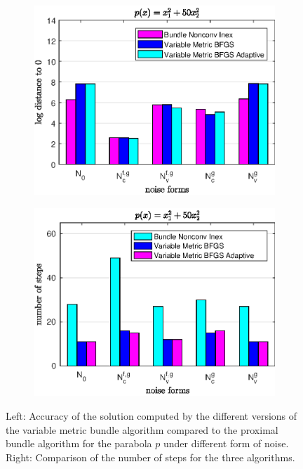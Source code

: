 \begin{figure}[H]
	\begin{subfigure}[t]{0.49\textwidth}
		\includegraphics[width=\textwidth]{Pictures/Plots/accuracy_bar_parab.eps}
	\end{subfigure}
	\begin{subfigure}[t]{0.49\textwidth}
			\includegraphics[width=\textwidth]{Pictures/Plots/steps_bar_parab.eps}
	\end{subfigure}
	\caption{Left: Accuracy of the solution computed by the different versions of the variable metric bundle algorithm compared to the proximal bundle algorithm for the parabola \(p\) under different form of noise.\\
	Right: Comparison of the number of steps for the three algorithms.}
	\label{fig_bar_parab}
\end{figure}

